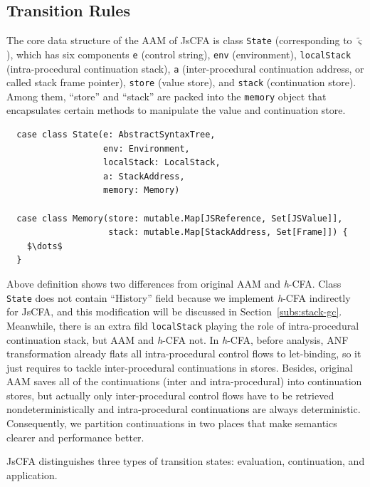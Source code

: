 \documentclass{article}
\begin{document}
\subsection{Transition Rules}
\label{sub:Transition}

The core data structure of the AAM of JsCFA is class \verb|State| (corresponding to $\tilde{\varsigma}$), which has six components \verb|e| (control string), \verb|env| (environment), \verb|localStack| (intra-procedural continuation stack), \verb|a| (inter-procedural continuation address, or called stack frame pointer), \verb|store| (value store), and \verb|stack| (continuation store). Among them, ``store'' and ``stack'' are packed into the \verb|memory| object that encapsulates certain methods to manipulate the value and continuation store.

\lstset{language=Scala, mathescape}
\begin{lstlisting}
  case class State(e: AbstractSyntaxTree,
                   env: Environment,
                   localStack: LocalStack,
                   a: StackAddress,
                   memory: Memory)

  case class Memory(store: mutable.Map[JSReference, Set[JSValue]],
                    stack: mutable.Map[StackAddress, Set[Frame]]) {
    $\dots$
  }
\end{lstlisting}

Above definition shows two differences from original AAM and \textit{h}-CFA\@. Class \verb|State| does not contain ``History'' field because we implement \textit{h}-CFA indirectly for JsCFA, and this modification will be discussed in Section~\ref{subs:stack-gc}.
Meanwhile, there is an extra fild \verb|localStack| playing the role of intra-procedural continuation stack, but AAM and \textit{h}-CFA not. In \textit{h}-CFA, before analysis, ANF transformation already flats all intra-procedural control flows to let-binding, so it just requires to tackle inter-procedural continuations in stores. Besides, original AAM saves all of the continuations (inter and intra-procedural) into continuation stores, but actually only inter-procedural control flows have to be retrieved nondeterministically and intra-procedural continuations are always deterministic.
Consequently, we partition continuations in two places that make semantics clearer and performance better.

JsCFA distinguishes three types of transition states: evaluation, continuation, and application.
\end{document}
